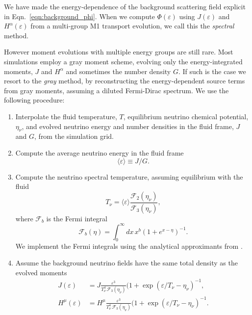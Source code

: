 \documentclass[aps,floatfix,prd,superscriptaddress,twocolumn]{revtex4-1}
\begin{document}
We have made the energy-dependence of the background scattering field
explicit in Eqn.~\ref{eqn:background_phi}.
When we compute $\Phi(\varepsilon)$ using $J(\varepsilon)$ and
$H^\alpha(\varepsilon)$ from a multi-group
M1 transport evolution, we call this the \emph{spectral} method.

However moment evolutions with multiple energy groups are still rare.
Most simulations employ a gray moment scheme,
evolving only the energy-integrated moments, $J$ and $H^\alpha$
and sometimes the number density $G$.
If such is the case we resort to the \emph{gray} method,
by reconstructing the energy-dependent source terms
from gray moments, assuming a diluted Fermi-Dirac spectrum.
We use the following procedure:
\begin{enumerate}
\item
  Interpolate the fluid temperature, $T$,
  equilibrium neutrino chemical potential, $\eta_\nu$,
  and evolved neutrino energy and number densities in the fluid frame,
  $J$ and $G$, from the simulation grid.
\item
  Compute the average neutrino energy in the fluid frame
  \begin{equation}
    \langle \varepsilon \rangle \equiv J/G.
  \end{equation}
\item
  Compute the neutrino spectral temperature, assuming equilibrium with the
  fluid
  \begin{equation}
    \label{eqn:spectral_temp}
    T_\nu = \langle \varepsilon \rangle
    \frac{\mathscr{F}_2(\eta_\nu)}{\mathscr{F}_3(\eta_\nu)},
  \end{equation}
  where $\mathscr{F}_b$ is the Fermi integral
  \begin{equation}
    \label{eqn:fermi_integral}
    \mathscr{F}_b(\eta) = \int_0^\infty dx \, x^b (1+e^{x-\eta})^{-1}.
  \end{equation}
  We implement the Fermi integrals using the analytical approximants from
  \cite{taka1978-beta_rates}.
\item
  Assume the background neutrino fields have the same total density
  as the evolved moments
  \begin{align}
    \label{eqn:J_from_gray}
    J(\varepsilon) &=
    J \frac{\varepsilon^3}{T_\nu^4 \,\mathscr{F}_3(\eta_\nu)}
    (1+\exp(\varepsilon/T_\nu-\eta_\nu)^{-1}, \\
    \label{eqn:H_from_gray}
    H^\mu(\varepsilon) &=
    H^\mu \frac{\varepsilon^3}{T_\nu^4\, \mathscr{F}_3(\eta_\nu)}
    (1+\exp(\varepsilon/T_\nu-\eta_\nu)^{-1}.
  \end{align}
\end{enumerate}
\end{document}
